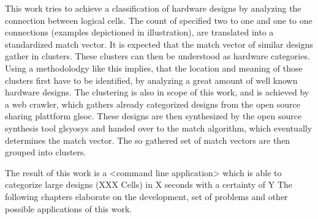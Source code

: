 This work tries to achieve a classification of hardware designs by analyzing the 
connection between logical cells. The count of specified two to one and one to 
one connections (examples depictioned in illustration), are translated into a
standardized match vector. It is expected that the match vector of similar designs
gather in clusters. These clusters can then be understood as hardware categories. 
Using a methodolodgy like this implies, that the location and meaning of those clusters first 
have to be identified, by analyzing a great amount of well known hardware designs.
The clustering is also in scope of this work, and is achieved by a web crawler,
which gathers already categorized designs from the open source sharing plattform 
gls{oc}. These designs are then synthesized by the open source synthesis tool 
gls{yosys} and handed over to the match algorithm, which eventually determines 
the match vector. The so gathered set of match vectors are then grouped into clusters.

The result of this work is a <command line application> which is able to 
categorize large designs (XXX Cells) in X seconds with a certainty of Y%
The following chapters elaborate on the development, set of problems and 
other possible applications of this work. 
  
